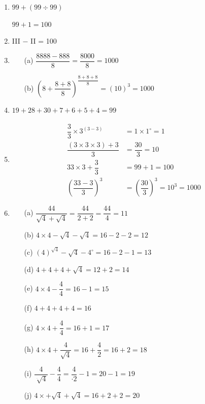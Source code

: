 \begin{enumerate}
\itemsep=5pt

\item $99 + (99\div 99)$

$99 + 1 = 100$

\item III $-$ II = 100

\item 
\begin{itemize}
\item[(a)] $\dfrac{8888 - 888}{8} = \dfrac{8000}{8} = 1000$
\item[(b)] $\left(8 + \dfrac{8+8}{8}\right)^{\dfrac{8+8+8}{8}} = (10)^{3} = 1000$
\end{itemize}

\item $19+28+30+7+6+5+4 = 99$

\item 
\begin{align*}
\dfrac{3}{3} \times 3^{(3-3)} & = 1\times 1^{\circ} = 1\\
\dfrac{(3\times 3\times 3) + 3}{3} & = \dfrac{30}{3} = 10\\
33\times 3 + \dfrac{3}{3} & = 99 + 1 = 100\\
\left(\dfrac{33-3}{3}\right)^{3} & = \left(\dfrac{30}{3}\right)^{3} = 10^{3} = 1000
\end{align*}

\item 
\begin{itemize}
\item[(a)] $\dfrac{44}{\sqrt{4} + \sqrt{4}} = \dfrac{44}{2+2} = \dfrac{44}{4} = 11$
\item[(b)] $4\times 4 - \sqrt{4} - \sqrt{4} = 16 - 2 - 2 = 12$
\item[(c)] $(4)^{\sqrt{4}} - \sqrt{4} - 4^{\circ} = 16 - 2 - 1 = 13$
\item[(d)] $4 + 4 + 4 + \sqrt{4} = 12 + 2 = 14$
\item[(e)] $4\times 4 - \dfrac{4}{4} = 16 - 1 = 15$
\item[(f)] $4+4+4+4 = 16$
\item[(g)] $4\times 4 + \dfrac{4}{4} = 16 + 1 = 17$
\item[(h)] $4\times 4 + \dfrac{4}{\sqrt{4}} = 16 + \dfrac{4}{2} = 16 + 2 = 18$
\item[(i)] $\dfrac{4}{\sqrt[\cdot]{4}} - \dfrac{4}{4} = \dfrac{4}{\cdot 2} - 1 = 20 - 1 = 19$
\item[(j)] $4\times + \sqrt{4} + \sqrt{4} = 16 + 2 + 2 = 20$
\end{itemize}


\end{enumerate}
